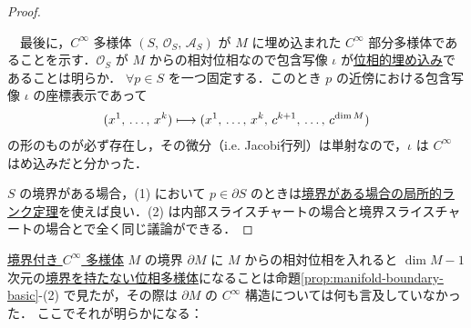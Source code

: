\documentclass[geometry_main]{subfiles}
\begin{document}
\begin{proof}
\begin{enumerate}
		　最後に，$C^\infty$ 多様体 $(S,\, \mathcal{O}_S,\, \mathcal{A}_S)$ が $M$ に埋め込まれた $C^\infty$ 部分多様体であることを示す．$\mathcal{O}_S$ が $M$ からの相対位相なので包含写像 $\iota$ が\hyperref[def:submersion-smooth]{位相的埋め込み}であることは明らか．
		$\forall p \in S$ を一つ固定する．このとき $p$ の近傍における包含写像 $\iota$ の座標表示であって
		\begin{align}
			(x^1,\, \dots,\, x^{k}) \longmapsto (x^1,\, \dots,\, x^{k},\, c^{k+1},\, \dots,\, c^{\dim M})
		\end{align}
		の形のものが必ず存在し，その微分（i.e. Jacobi行列）は単射なので，$\iota$ は $C^\infty$ はめ込みだと分かった．
	\end{enumerate}
	$S$ の境界がある場合，(1) において $p \in \partial S$ のときは\hyperref[thm:rank-b]{境界がある場合の局所的ランク定理}を使えば良い．(2) は内部スライスチャートの場合と境界スライスチャートの場合とで全く同じ議論ができる．
\end{proof}

\hyperref[def:mani-with-boundary]{境界付き $C^\infty$ 多様体} $M$ の境界 $\partial M$ に $M$ からの相対位相を入れると $\dim M - 1$ 次元の\hyperref[def.topomani]{境界を持たない位相多様体}になることは命題\ref{prop:manifold-boundary-basic}-(2) で見たが，その際は $\partial M$ の $C^\infty$ 構造については何も言及していなかった．
ここでそれが明らかになる：
\end{document}
